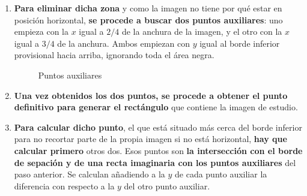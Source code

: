 \begin{enumerate}
\begin{enumerate}[label*=\arabic*.]
    \begin{enumerate}[label*=\arabic*.]
    \item\label{algoritmo_coroides:recortar_sobrante} \textbf{Para
        eliminar dicha zona} y como la imagen no tiene por qué estar
      en posición horizontal, \textbf{se procede a buscar dos puntos
        auxiliares}: uno empieza con la $x$ igual a $2/4$ de la
      anchura de la imagen, y el otro con la $x$ igual a $3/4$ de la
      anchura. Ambos empiezan con $y$ igual al borde inferior
      provisional hacia arriba, ignorando toda el área negra.

      \begin{figure}[H]
        \caption{Puntos auxiliares}
        \centering \setlength\fboxsep{0pt} \setlength\fboxrule{0.5pt}
      \end{figure}

    \item \textbf{Una vez obtenidos los dos puntos, se procede a
        obtener el punto definitivo para generar el rectángulo} que
      contiene la imagen de estudio.

    \item \textbf{Para calcular dicho punto}, el que está situado más
      cerca del borde inferior para no recortar parte de la propia
      imagen si no está horizontal, \textbf{hay que calcular primero}
      otros dos. Esos puntos son \textbf{la intersección con el borde
        de sepación y de una recta imaginaria con los puntos
        auxiliares} del paso anterior. Se calculan añadiendo a la $y$
      de cada punto auxiliar la diferencia con respecto a la $y$ del
      otro punto auxiliar.


\end{enumerate}
\end{enumerate}
\end{enumerate}
